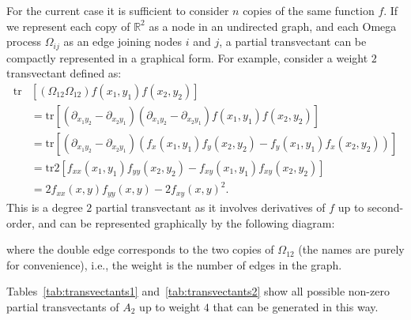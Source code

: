 \documentclass[review,onefignum,onetabnum]{siamonline190516}
\begin{document}
For the current case it is sufficient to consider $n$ copies of the same
function $f$. If we represent each copy of $\mathbb{R}^2$ as a node in an
undirected graph, and each Omega process $\Omega_{ij}$ as an edge joining
nodes $i$ and $j$, a partial transvectant can be compactly represented in a
graphical form. For example, consider a weight $2$ transvectant defined as:
\begin{align*}
    \mbox{tr} &\left[(\Omega_{12}\Omega_{12}) f(x_1, y_1)f(x_2, y_2)\right] \\
    &= \mbox{tr}\left[(\partial_{x_1 y_2} - \partial_{x_2y_1})(\partial_{x_1 y_2} -
    \partial_{x_2y_1})f(x_1, y_1)f(x_2, y_2)\right]\\
    &= \mbox{tr}\left[\left(\partial_{x_1 y_2} - \partial_{x_2 y_1}\right)\left(f_x(x_1, y_1)f_y(x_2, y_2) - f_y(x_1, y_1)f_x(x_2, y_2)\right)\right] \\
    &= \mbox{tr} 2 \left[f_{xx}(x_1, y_1)f_{yy}(x_2, y_2) - f_{xy}(x_1, y_1)f_{xy}(x_2, y_2)\right] \\
    &= 2 f_{xx}(x, y) f_{yy}(x, y) - 2 f_{xy}(x, y)^2.
\end{align*}
This is a degree $2$ partial transvectant as it involves derivatives of $f$
up to second-order, and can be represented graphically by the following
diagram:
\begin{center}
\end{center}
where the double edge corresponds to the two copies of $\Omega_{12}$ (the names are purely for convenience), i.e.,
the weight is the number of edges in the graph.

Tables~\ref{tab:transvectants1} and~\ref{tab:transvectants2} show all possible non-zero partial
transvectants of $A_2$ up to weight $4$ that can be generated in this way.
\end{document}
